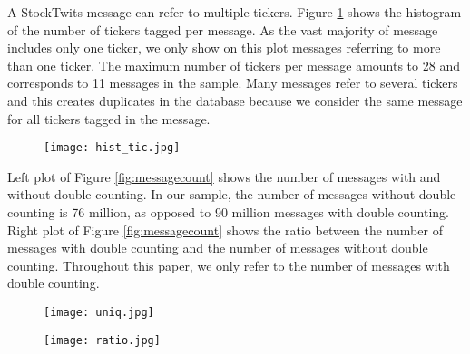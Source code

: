 A StockTwits message can refer to multiple tickers. Figure \ref{fig:tickerpermessage} shows the histogram of the number of tickers tagged per message. As the vast majority of message includes only one ticker, we only show on this plot messages referring to more than one ticker. The maximum number of tickers per message amounts to 28 and corresponds to 11 messages in the sample. Many messages refer to several tickers and this creates duplicates in the database because we consider the same message for all tickers tagged in the message. 


\begin{figure}[h]
    \centering
    \texttt{[image: hist\_tic.jpg]}
    \label{fig:tickerpermessage}
\end{figure}

Left plot of Figure \ref{fig:messagecount} shows the number of messages with and without double counting. In our sample, the number of messages without double counting is 76 million, as opposed to 90 million messages with double counting. Right plot of Figure \ref{fig:messagecount} shows the ratio between the number of messages with double counting and the number of messages without double counting. Throughout this paper, we only refer to the number of messages with double counting.



\begin{figure*}[h!]
\centering
        \begin{subfigure}{0.49\textwidth}   
            \centering 
            \texttt{[image: uniq.jpg]}
        \end{subfigure}
        \begin{subfigure}{0.49\textwidth}   
            \centering 
            \texttt{[image: ratio.jpg]}
        \end{subfigure}
        \label{fig:messagecount}
\end{figure*}


